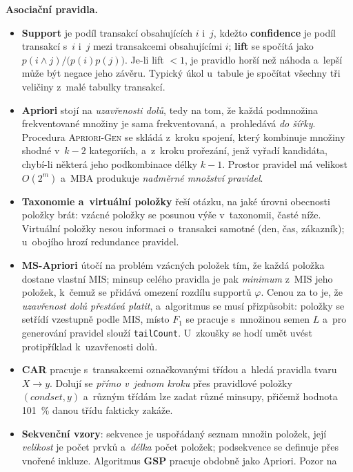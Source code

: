 \documentclass[11pt,a4paper]{article}
\theoremstyle{definition}
\begin{document}
\textbf{Asociační pravidla.}
\begin{itemize}
\item \textbf{Support} je podíl transakcí obsahujících $i$ i~$j$, kdežto \textbf{confidence}
      je podíl transakcí s~$i$ i~$j$ mezi transakcemi obsahujícími $i$; \textbf{lift} se
      spočítá jako $p(i\wedge j)/\big(p(i)p(j)\big)$. Je-li lift $<1$, je pravidlo horší než
      náhoda a~lepší může být negace jeho závěru. Typický úkol u~tabule je spočítat všechny
      tři veličiny z~malé tabulky transakcí.
\item \textbf{Apriori} stojí na \emph{uzavřenosti dolů}, tedy na tom, že každá podmnožina
      frekventované množiny je sama frekventovaná, a~prohledává \emph{do šířky}. Procedura
      \textsc{Apriori-Gen} se skládá z~kroku spojení, který kombinuje množiny shodné
      v~$k-2$ kategoriích, a~z~kroku prořezání, jenž vyřadí kandidáta, chybí-li některá jeho
      podkombinace délky $k-1$. Prostor pravidel má velikost $O(2^m)$ a~MBA produkuje
      \emph{nadměrné množství pravidel}.
\item \textbf{Taxonomie a~virtuální položky} řeší otázku, na jaké úrovni obecnosti položky
      brát: vzácné položky se posunou výše v~taxonomii, časté níže. Virtuální položky nesou
      informaci o~transakci samotné (den, čas, zákazník); u~obojího hrozí redundance
      pravidel.
\item \textbf{MS-Apriori} útočí na problém vzácných položek tím, že každá položka dostane
      vlastní $\mathrm{MIS}$; minsup celého pravidla je pak \emph{minimum} z~MIS jeho položek,
      k~čemuž se přidává omezení rozdílu supportů $\varphi$. Cenou za to je, že
      \emph{uzavřenost dolů přestává platit}, a~algoritmus se musí přizpůsobit: položky se
      setřídí vzestupně podle MIS, místo $F_1$ se pracuje s~množinou semen $L$ a~pro generování
      pravidel slouží \texttt{tailCount}. U~zkoušky se hodí umět uvést protipříklad
      k~uzavřenosti dolů.
\item \textbf{CAR} pracuje s~transakcemi označkovanými třídou a~hledá pravidla tvaru
      $X\to y$. Dolují se \emph{přímo v~jednom kroku} přes pravidlové položky
      $(\mathit{condset},y)$ a~různým třídám lze zadat různé minsupy, přičemž hodnota
      101~\% danou třídu fakticky zakáže.
\item \textbf{Sekvenční vzory}: sekvence je uspořádaný seznam množin položek, její
      \emph{velikost} je počet prvků a~\emph{délka} počet položek; podsekvence se definuje
      přes vnořené inkluze. Algoritmus \textbf{GSP} pracuje obdobně jako Apriori. Pozor na

\end{itemize}
\end{document}
